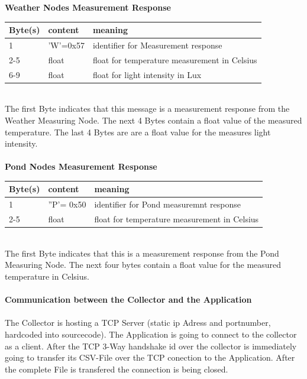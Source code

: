 \documentclass[
	11pt,
	a4paper
]{article}%
\begin{document}
\textbf{Weather Nodes Measurement Response}
\begin{table}[h]
    \begin{tabular}{|l|l|l|}
    \hline
    \rowcolor{dunkelgrau}
    Byte(s) & content  & meaning                                      \\ \hline
    1       & 'W'=0x57 & identifier for Measurement response          \\ \hline
    2-5     & float    & float for temperature measurement in Celsius \\
    6-9     & float    & float for light intensity in Lux             \\
    \end{tabular}
\end{table}\\
The first Byte indicates that this message is a measurement response from the Weather Measuring Node. The next 4 Bytes contain a float value of the measured temperature. The last 4 Bytes are are a float value for the measures light intensity.
\\\\
\textbf{Pond Nodes Measurement Response}
\begin{table}[h]
    \begin{tabular}{|l|l|l|}
    \hline
    \rowcolor{dunkelgrau}
    Byte(s) & content  		& meaning                            \\ \hline
    1       & ''P'= 0x50 	& identifier for Pond measuremnt response \\ \hline
    2-5		& float			& float for temperature measurement in Celsius \\ \hline
    \end{tabular}
\end{table}\\
The first Byte indicates that this is a measurement response from the Pond Measuring Node. The next four bytes contain a float value for the measured temperature in Celsius.
\\\\
\textbf{Communication between the Collector and the Application}\\\\
The Collector is hosting a TCP Server (static ip Adress and portnumber, hardcoded into sourcecode). The Application is going to connect to the collector as a client. After the TCP 3-Way handshake id over the collector is immediately going to transfer its CSV-File over the TCP conection to the Application. After the complete File is transfered the connection is being closed.
\end{document}
